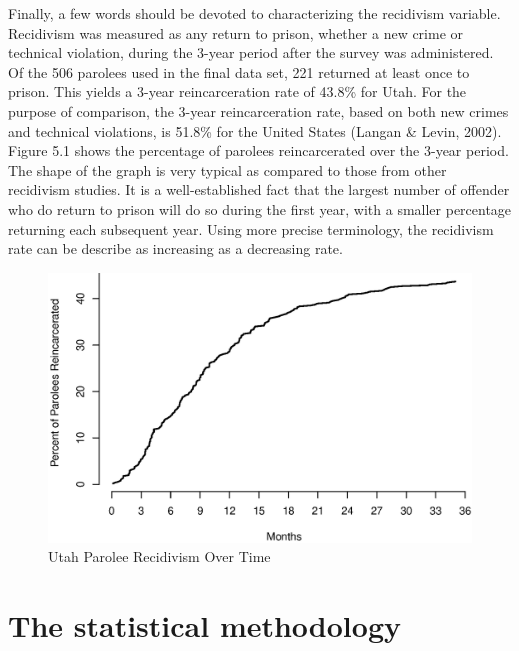Finally, a few words should be devoted to characterizing the recidivism variable.  Recidivism was measured as any return to prison, whether a new crime or technical violation, during the 3-year period after the survey was administered.  Of the 506 parolees used in the final data set, 221 returned at least once to prison.  This yields a 3-year reincarceration rate of 43.8\% for Utah.  For the purpose of comparison, the 3-year reincarceration rate, based on both new crimes and technical violations, is 51.8\% for the United States (Langan \& Levin, 2002).  Figure 5.1 shows the percentage of parolees reincarcerated over the 3-year period.  The shape of the graph is very typical as compared to those from other recidivism studies.  It is a well-established fact that the largest number of offender who do return to prison will do so during the first year, with a smaller percentage returning each subsequent year.  Using more precise terminology, the recidivism rate can be describe as increasing as a decreasing rate.

\begin{figure}[b]
\begin{center}
\includegraphics[scale=0.8]{graph531.eps}
\caption{Utah Parolee Recidivism Over Time}
\end{center}
\end{figure}

\section{The statistical methodology}

